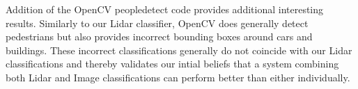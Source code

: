 \documentclass[10pt,twocolumn,letterpaper]{article}
\begin{document}
  Addition of the OpenCV peopledetect code provides additional interesting
  results. Similarly to our Lidar classifier, OpenCV does generally detect
  pedestrians but also provides incorrect bounding boxes around cars and buildings.
  These incorrect classifications generally do not coincide with our Lidar
  classifications and thereby validates our intial beliefs that a system combining
  both Lidar and Image classifications can perform better than either individually.


{\small


}
\end{document}
